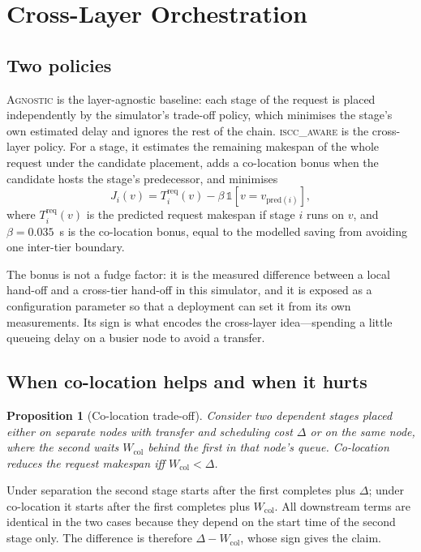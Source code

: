 \documentclass[journal,10pt]{IEEEtran}
\newtheorem{proposition}{Proposition}
\begin{document}
\section{Cross-Layer Orchestration}
\label{sec:method}

\subsection{Two policies}
\textsc{Agnostic} is the layer-agnostic baseline: each stage of the request is
placed independently by the simulator's trade-off policy, which minimises the
stage's own estimated delay and ignores the rest of the chain.
\textsc{iscc\_aware} is the cross-layer policy. For a stage, it estimates the
remaining makespan of the whole request under the candidate placement, adds a
co-location bonus when the candidate hosts the stage's predecessor, and
minimises
\begin{equation}
J_i(v)=T^{\text{req}}_i(v)-\beta\,\mathbb{1}[v=v_{\text{pred}(i)}],
\label{eq:score}
\end{equation}
where $T^{\text{req}}_i(v)$ is the predicted request makespan if stage $i$ runs
on $v$, and $\beta=0.035$~s is the co-location bonus, equal to the modelled
saving from avoiding one inter-tier boundary.

The bonus is not a fudge factor: it is the measured difference between a local
hand-off and a cross-tier hand-off in this simulator, and it is exposed as a
configuration parameter so that a deployment can set it from its own
measurements. Its sign is what encodes the cross-layer idea---spending a little
queueing delay on a busier node to avoid a transfer.

\subsection{When co-location helps and when it hurts}
\begin{proposition}[Co-location trade-off]
\label{prop:coloc}
Consider two dependent stages placed either on separate nodes with transfer and
scheduling cost $\Delta$ or on the same node, where the second waits
$W_{\text{col}}$ behind the first in that node's queue. Co-location reduces the
request makespan iff $W_{\text{col}}<\Delta$.
\end{proposition}
\begin{IEEEproof}
Under separation the second stage starts after the first completes plus
$\Delta$; under co-location it starts after the first completes plus
$W_{\text{col}}$. All downstream terms are identical in the two cases because
they depend on the start time of the second stage only. The difference is
therefore $\Delta-W_{\text{col}}$, whose sign gives the claim.
\end{IEEEproof}
\end{document}
